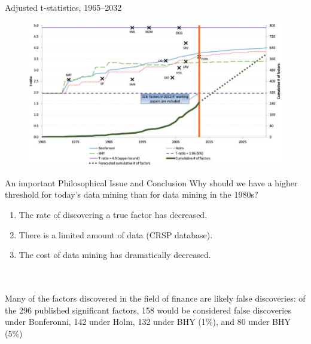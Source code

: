 \documentclass[UTF8, 16pt]{beamer}
\begin{document}
\begin{CJK*}{UTF8}{gbsn}
\begin{frame}{Adjusted t-statistics, 1965–2032}
\begin{figure}[htpb]
  		\begin{center}
    	\includegraphics[width=1.05 \linewidth]
    	{pic/Adjusted-t-statistics.jpg}
	  	\end{center}
	\end{figure}
\end{frame}
\begin{frame}{An important Philosophical Issue and Conclusion}
	Why should we have a higher threshold for today’s data mining than for data mining in the 1980s?
	\begin{enumerate}
		\item The rate of \alert{discovering} a true factor has decreased.
		\item There is a limited amount of \alert{data} (CRSP database).
		\item The \alert{cost} of data mining has dramatically decreased.
	\end{enumerate}
	\\\ \\
	Many of the factors discovered in the field of finance are likely false discoveries: of the 296 published significant factors, 158 would be considered false discoveries under Bonferonni, 142 under Holm, 132 under BHY (1\%), and 80 under BHY (5\%)
\end{frame}


\end{CJK*}
\end{document}
